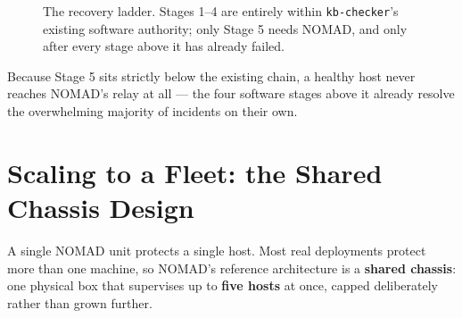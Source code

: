 \documentclass[11pt,a4paper]{article}
\newcommand{\figcap}[1]{\caption{#1}}
\begin{document}
\begin{figure}[h!]
\centering
{}
\figcap{The recovery ladder. Stages 1--4 are entirely within \texttt{kb-checker}'s existing software authority; only Stage 5 needs NOMAD, and only after every stage above it has already failed.}
\label{fig:ladder}
\end{figure}

Because Stage 5 sits strictly below the existing chain, a healthy host
never reaches NOMAD's relay at all --- the four software stages above it
already resolve the overwhelming majority of incidents on their own.

\section{Scaling to a Fleet: the Shared Chassis Design}
\label{sec:scaling}

A single NOMAD unit protects a single host. Most real deployments protect
more than one machine, so NOMAD's reference architecture is a
\textbf{shared chassis}: one physical box that supervises up to
\textbf{five hosts} at once, capped deliberately rather than grown
further.
\end{document}
